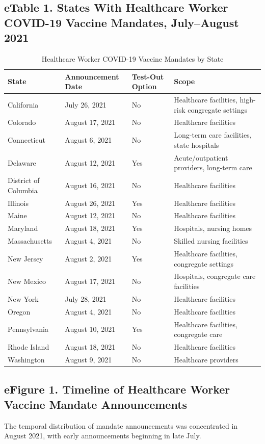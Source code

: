 \documentclass[10pt, letterpaper]{article}
\begin{document}
\subsection*{eTable 1. States With Healthcare Worker COVID-19 Vaccine Mandates, July--August 2021}
\begin{table}[H]
\centering
\sffamily\fontsize{8.5}{11}\selectfont
{}
\caption{Healthcare Worker COVID-19 Vaccine Mandates by State}
\begin{tabularx}{\textwidth}{@{} >{\raggedright\arraybackslash}p{2cm}
  >{\centering\arraybackslash}X
  >{\centering\arraybackslash}X
  >{\centering\arraybackslash}X @{}}
\toprule
\textbf{State} & \textbf{Announcement Date} & \textbf{Test-Out Option} & \textbf{Scope} \\
\midrule
California & July 26, 2021 & No & Healthcare facilities, high-risk congregate settings \\
Colorado & August 17, 2021 & No & Healthcare facilities \\
Connecticut & August 6, 2021 & No & Long-term care facilities, state hospitals \\
Delaware & August 12, 2021 & Yes & Acute/outpatient providers, long-term care \\
District of Columbia & August 16, 2021 & No & Healthcare facilities \\
Illinois & August 26, 2021 & Yes & Healthcare facilities \\
Maine & August 12, 2021 & No & Healthcare facilities \\
Maryland & August 18, 2021 & Yes & Hospitals, nursing homes \\
Massachusetts & August 4, 2021 & No & Skilled nursing facilities \\
New Jersey & August 2, 2021 & Yes & Healthcare facilities, congregate settings \\
New Mexico & August 17, 2021 & No & Hospitals, congregate care facilities \\
New York & July 28, 2021 & No & Healthcare facilities \\
Oregon & August 4, 2021 & No & Healthcare facilities \\
Pennsylvania & August 10, 2021 & Yes & Healthcare facilities, congregate care \\
Rhode Island & August 18, 2021 & No & Healthcare facilities \\
Washington & August 9, 2021 & No & Healthcare providers \\
\bottomrule
\end{tabularx}
\end{table}

\subsection*{eFigure 1. Timeline of Healthcare Worker Vaccine Mandate Announcements}
The temporal distribution of mandate announcements was concentrated in August 2021, with early announcements beginning in late July.
\end{document}

